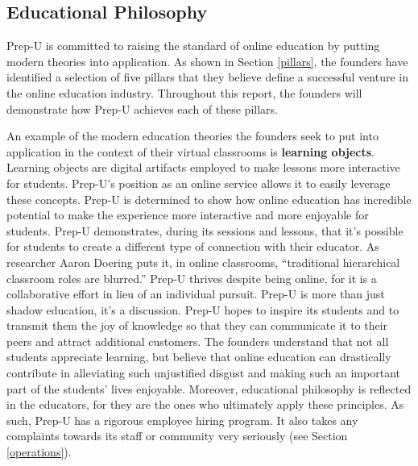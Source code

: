 \documentclass{business}
\begin{document}
    \subsection{Educational Philosophy}\label{educational-philosophy}
    Prep-U is committed to raising the standard of online education by putting modern theories into application. As shown in Section \ref{pillars}, the founders have identified a selection of five pillars that they believe define a successful venture in the online education industry. Throughout this report, the founders will demonstrate how Prep-U achieves each of these pillars. \par
    An example of the modern education theories the founders seek to put into application in the context of their virtual classrooms is \textbf{learning objects}. Learning objects are digital artifacts employed to make lessons more interactive for students. Prep-U’s position as an online service allows it to easily leverage these concepts. \cite{Vanessa} Prep-U is determined to show how online education has incredible potential to make the experience more interactive and more enjoyable for students. Prep-U demonstrates, during its sessions and lessons, that it’s possible for students to create a different type of connection with their educator. As researcher Aaron Doering puts it, in online classrooms, ``traditional hierarchical classroom roles are blurred.'' \cite{Doering2007} Prep-U thrives despite being online, for it is a collaborative effort in lieu of an individual pursuit. Prep-U is more than just shadow education, it’s a discussion. Prep-U hopes to inspire its students and to transmit them the joy of knowledge so that they can communicate it to their peers and attract additional customers. The founders understand that not all students appreciate learning, but believe that online education can drastically contribute in alleviating such unjustified disgust and making such an important part of the students’ lives enjoyable. Moreover, educational philosophy is reflected in the educators, for they are the ones who ultimately apply these principles. As such, Prep-U has a rigorous employee hiring program. It also takes any complaints towards its staff or community very seriously (see Section \ref{operations}).
\end{document}
